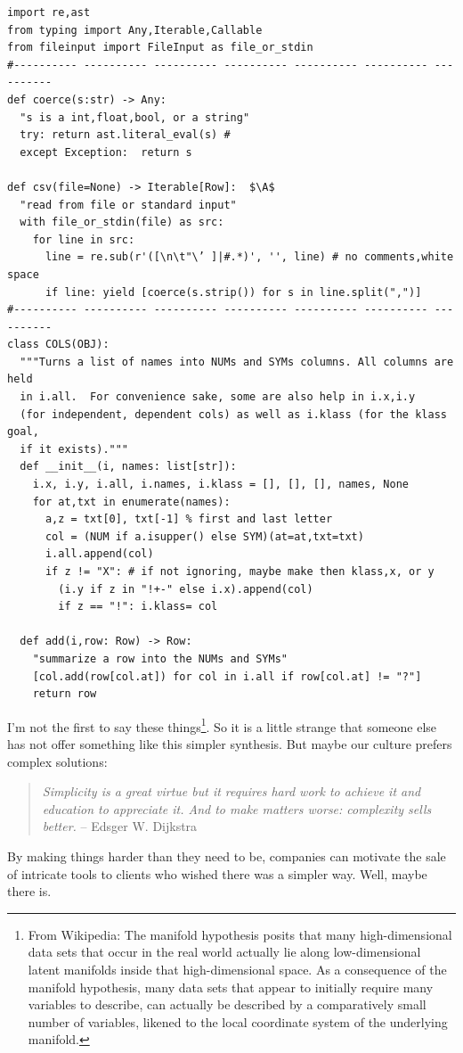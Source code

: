 \documentclass[landscape,	DIV=calc,%
							paper=letter,%
							fontsize=10pt,%
							twocolumn]{scrartcl}	 					%
\newcommand*\circled[1]{\tikz[baseline=(char.base)]{
            \node[minimum width=1pt, shape=circle,fill=black,inner sep=1pt] (char) {{\footnotesize \textcolor{white}{#1}}};}}
\newcommand{\A}{\circled{a}}
\begin{document}
\begin{table}[!t]{\linewidth}
\begin{lstlisting}[caption=Python example]
import re,ast
from typing import Any,Iterable,Callable
from fileinput import FileInput as file_or_stdin
#---------- ---------- ---------- ---------- ---------- ---------- ----------
def coerce(s:str) -> Any:
  "s is a int,float,bool, or a string"
  try: return ast.literal_eval(s) # 
  except Exception:  return s

def csv(file=None) -> Iterable[Row]:  $\A$
  "read from file or standard input"
  with file_or_stdin(file) as src: 
    for line in src:
      line = re.sub(r'([\n\t"\’ ]|#.*)', '', line) # no comments,white space
      if line: yield [coerce(s.strip()) for s in line.split(",")]
#---------- ---------- ---------- ---------- ---------- ---------- ----------
class COLS(OBJ): 
  """Turns a list of names into NUMs and SYMs columns. All columns are held 
  in i.all.  For convenience sake, some are also help in i.x,i.y 
  (for independent, dependent cols) as well as i.klass (for the klass goal, 
  if it exists)."""
  def __init__(i, names: list[str]): 
    i.x, i.y, i.all, i.names, i.klass = [], [], [], names, None
    for at,txt in enumerate(names):
      a,z = txt[0], txt[-1] % first and last letter
      col = (NUM if a.isupper() else SYM)(at=at,txt=txt)
      i.all.append(col)
      if z != "X": # if not ignoring, maybe make then klass,x, or y
        (i.y if z in "!+-" else i.x).append(col)
        if z == "!": i.klass= col

  def add(i,row: Row) -> Row: 
    "summarize a row into the NUMs and SYMs"
    [col.add(row[col.at]) for col in i.all if row[col.at] != "?"]
    return row
\end{lstlisting}
\end{table}

I'm not the first to say these things\footnote{
From Wikipedia: The manifold hypothesis posits that many
high-dimensional data sets that occur in the real world actually
lie along low-dimensional latent manifolds inside that high-dimensional
space. As a consequence of the manifold hypothesis, many data sets
that appear to initially require many variables to describe, can
actually be described by a comparatively small number of variables,
likened to the local coordinate system of the underlying manifold.}.
So it is a little
strange that someone else has not offer something like this simpler
synthesis. But maybe our culture prefers complex solutions:

\begin{quote}{\em Simplicity is a great virtue but it requires hard work to achieve
it and education to appreciate it. And to make matters worse:
complexity sells better.}\newline
-- Edsger W. Dijkstra
\end{quote}

By making things harder than they need to be, companies can motivate
the sale  of intricate tools to clients who wished there was a
simpler way. Well, maybe there is.




\end{document}
